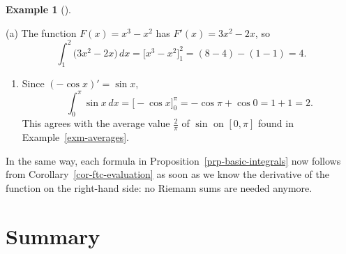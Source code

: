 \documentclass[
  letterpaper,
  DIV=11,
  numbers=noendperiod]{scrreprt}
\providecommand{\tightlist}{%
  \setlength{\itemsep}{0pt}\setlength{\parskip}{0pt}}
\theoremstyle{plain}
\theoremstyle{plain}
\theoremstyle{definition}
\theoremstyle{definition}
\theoremstyle{definition}
\newtheorem{example}{Example}[chapter]
\theoremstyle{plain}
\theoremstyle{plain}
\theoremstyle{remark}
\begin{document}
\begin{example}[]\protect\hypertarget{exm-ftc-evaluation}{}\label{exm-ftc-evaluation}

\hfill\break
(a) The function \(F(x) = x^3 - x^2\) has \(F'(x) = 3x^2 - 2x\), so \[
\int_1^2 \big(3x^2 - 2x\big)\,dx = \Big[x^3 - x^2\Big]_1^2 = (8-4) - (1-1) = 4 .
\]

\begin{enumerate}
\def\labelenumi{(\alph{enumi})}
\setcounter{enumi}{1}
\tightlist
\item
  Since \((-\cos x)' = \sin x\), \[
  \int_0^\pi \sin x\,dx = \Big[-\cos x\Big]_0^\pi = -\cos\pi + \cos 0 = 1 + 1 = 2 .
  \] This agrees with the average value \(\frac2\pi\) of \(\sin\) on
  \([0,\pi]\) found in Example~\ref{exm-averages}.
\end{enumerate}

\end{example}

In the same way, each formula in Proposition~\ref{prp-basic-integrals}
now follows from Corollary~\ref{cor-ftc-evaluation} as soon as we know
the derivative of the function on the right-hand side: no Riemann sums
are needed anymore.

\section{Summary}\label{summary-13}
\end{document}
